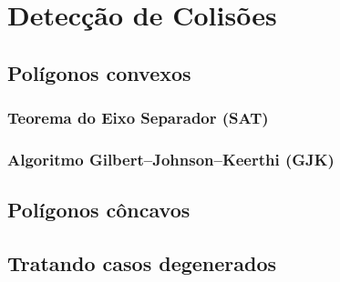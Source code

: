 \chapter{Detecção de Colisões}

\section{Polígonos convexos}

\subsection{Teorema do Eixo Separador (SAT)}

\subsection{Algoritmo Gilbert–Johnson–Keerthi (GJK)}

\section{Polígonos côncavos}

\section{Tratando casos degenerados}
